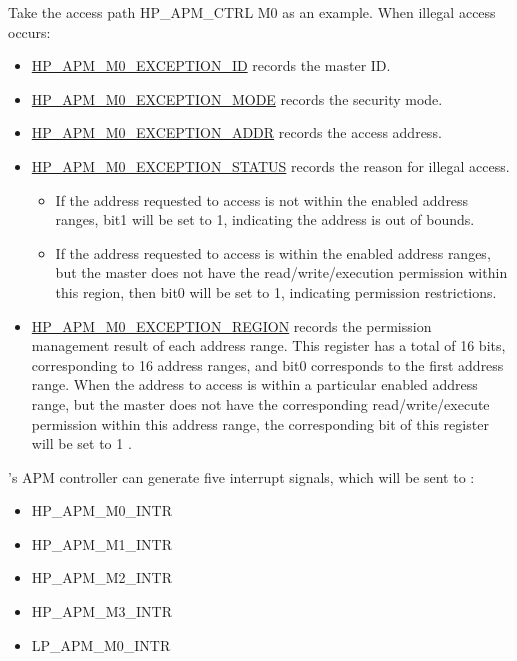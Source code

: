\documentclass[main\_\_EN.tex]{subfiles}
\begin{document}
Take the access path HP\_APM\_CTRL M0 as an example. When illegal access occurs:

\begin{itemize}
    \item \hyperref[fielddesc:HPAPMM0EXCEPTIONID]{HP\_APM\_M0\_EXCEPTION\_ID} records the master ID.
    \item \hyperref[fielddesc:HPAPMM0EXCEPTIONMODE]{HP\_APM\_M0\_EXCEPTION\_MODE} records the security mode.
    \item \hyperref[fielddesc:HPAPMM0EXCEPTIONADDR]{HP\_APM\_M0\_EXCEPTION\_ADDR} records the access address.
    \item \hyperref[fielddesc:HPAPMM0EXCEPTIONSTATUS]{HP\_APM\_M0\_EXCEPTION\_STATUS} records the reason for illegal access.
    \begin{itemize}
        \item If the address requested to access is not within the enabled address ranges, bit1 will be set to 1, indicating the address is out of bounds.
        \item If the address requested to access is within the enabled address ranges, but the master does not have the read/write/execution permission within this region, then bit0 will be set to 1, indicating permission restrictions.
    \end{itemize}

    \item \hyperref[fielddesc:HPAPMM0EXCEPTIONREGION]{HP\_APM\_M0\_EXCEPTION\_REGION} records the permission management result of each address range. This register has a total of 16 bits, corresponding to 16 address ranges, and bit0 corresponds to the first address range. When the address to access is within a particular enabled address range, but the master does not have the corresponding read/write/execute permission within this address range, the corresponding bit of this register will be set to 1 .

\end{itemize}

\chipname{}'s APM controller can generate five interrupt signals, which will be sent to \textit{}:

    \begin{itemize}
    \item HP\_APM\_M0\_INTR
    \item HP\_APM\_M1\_INTR
    \item HP\_APM\_M2\_INTR
    \item HP\_APM\_M3\_INTR
    \item LP\_APM\_M0\_INTR
    \end{itemize}
\end{document}
